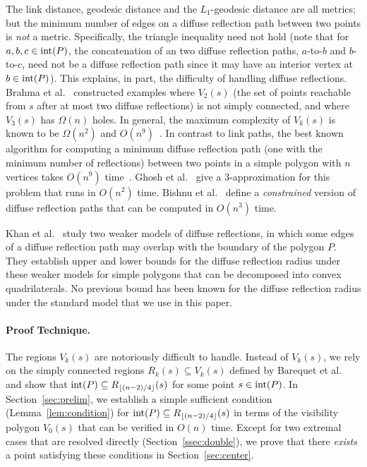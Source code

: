 \documentclass[12pt]{article}
\newcommand{\floor}[1]{{\lfloor #1 \rfloor}}
\begin{document}
The link distance, geodesic distance and the $L_1$-geodesic distance are all metrics; but the minimum number of edges on a diffuse reflection path between two points is \emph{not} a metric. Specifically, the triangle inequality need not hold (note that for $a,b,c\in {\rm int}(P)$, the concatenation of an two diffuse reflection paths, $a$-to-$b$ and $b$-to-$c$, need not be a diffuse reflection path since it may have an interior vertex at $b\in {\rm int}(P)$). This explains, in part, the difficulty of handling diffuse reflections.
Brahma et al.~\cite{BPS04} constructed examples where $V_2(s)$ (the set of points reachable from $s$ after at most two diffuse reflections) is not simply connected, and where $V_3(s)$ has $\Omega(n)$ holes. In general, the maximum complexity of $V_k(s)$ is known to be $\Omega(n^2)$ and $O(n^9)$~\cite{ADI+06}. In contrast to link paths, the best known algorithm for computing a minimum diffuse reflection path (one with the minimum number of reflections) between two points in a simple polygon with $n$ vertices takes $O(n^9)$ time~\cite{ADI+06,G07}.
Ghosh et al.~\cite{GGM+12} give a 3-approximation for this problem that runs in $O(n^2)$ time. Bishnu et al.~\cite{BGG+14} define a \emph{constrained} version of diffuse reflection paths that can be computed in $O(n^3)$ time.

Khan et al.~\cite{KPA+13} study two weaker models of diffuse reflections, in which some edges of a diffuse reflection path may overlap with the boundary of the polygon $P$. They establish upper and lower bounds for
the diffuse reflection radius under these weaker models for simple polygons that can be decomposed into convex quadrilaterals. No previous bound has been known for the diffuse reflection radius under the standard model that we use in this paper.

\paragraph{\bf Proof Technique.}
The regions $V_k(s)$ are notoriously difficult to handle. Instead of $V_k(s)$, we rely on the simply connected regions $R_k(s)\subseteq V_k(s)$ defined by Barequet et al.~\cite{Us} and show that ${\rm int}(P)\subseteq R_{\floor{(n-2)/4}}(s)$ for some point $s\in {\rm int}(P)$. In Section~\ref{sec:prelim}, we establish a simple sufficient condition (Lemma~\ref{lem:condition}) for ${\rm int}(P)\subseteq R_{\floor{(n-2)/4}}(s)$ in terms of the visibility polygon $V_0(s)$ that can be verified in $O(n)$ time. Except for two extremal cases that are resolved directly (Section~\ref{ssec:double}), we prove that there \emph{exists} a point satisfying these conditions in Section~\ref{sec:center}.
\end{document}
